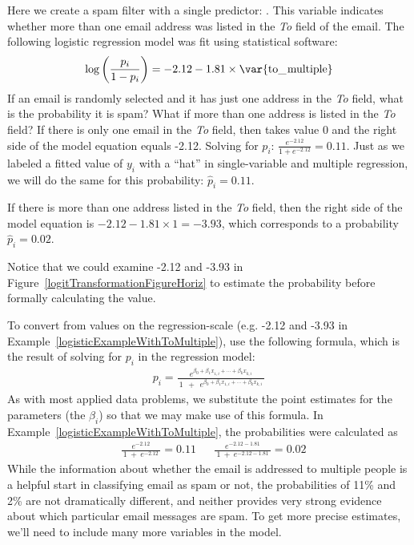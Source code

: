 \textB{\pagebreak}

\begin{example}{Here we create a spam filter with a single predictor: . This variable indicates whether more than one email address was listed in the \emph{To} field of the email. The following logistic regression model was fit using statistical software:
\begin{align*}
\log\left( \frac{p_i}{1-p_i} \right) = -2.12 - 1.81\times\text{\var{to\_\hspace{0.3mm}multiple}}
\end{align*}
If an email is randomly selected and it has just one address in the \emph{To} field, what is the probability it is spam? What if more than one address is listed in the \emph{To} field?}\label{logisticExampleWithToMultiple}
If there is only one email in the \emph{To} field, then  takes value 0 and the right side of the model equation equals -2.12. Solving for $p_i$: $\frac{e^{-2.12}}{1 + e^{-2.12}} = 0.11$. Just as we labeled a fitted value of $y_i$ with a ``hat'' in single-variable and multiple regression, we will do the same for this probability: $\hat{p}_i = 0.11$.

If there is more than one address listed in the \emph{To} field, then the right side of the model equation is $-2.12 - 1.81\times1 = -3.93$, which corresponds to a probability $\hat{p}_i = 0.02$.

Notice that we could examine -2.12 and -3.93 in Figure~\ref{logitTransformationFigureHoriz} to estimate the probability before formally calculating the value.
\end{example}

To convert from values on the regression-scale (e.g. -2.12 and -3.93 in Example~\ref{logisticExampleWithToMultiple}), use the following formula, which is the result of solving for $p_i$ in the regression model:
\begin{align*}
p_i
	= \frac{e^{\beta_0 + \beta_1 x_{1,i}+\cdots+\beta_k x_{k,i}}}
		{\ 1\ \ +\ \ e^{\beta_0 + \beta_1 x_{1,i}+\cdots+\beta_k x_{k,i}}\ }
\end{align*}
As with most applied data problems, we substitute the point estimates for the parameters (the $\beta_i$) so that we may make use of this formula. In Example~\ref{logisticExampleWithToMultiple}, the probabilities were calculated as
\begin{align*}
&\frac{\ e^{-2.12}\ }{\ 1\ +\ e^{-2.12}\ } = 0.11 && \frac{\ e^{-2.12 - 1.81}\ }{\ 1\ +\ e^{-2.12 - 1.81}\ } = 0.02
\end{align*}
While the information about whether the email is addressed to multiple people is a helpful start in classifying email as spam or not, the probabilities of 11\% and 2\% are not dramatically different, and neither provides very strong evidence about which particular email messages are spam. To get more precise estimates, we'll need to include many more variables in the model.

